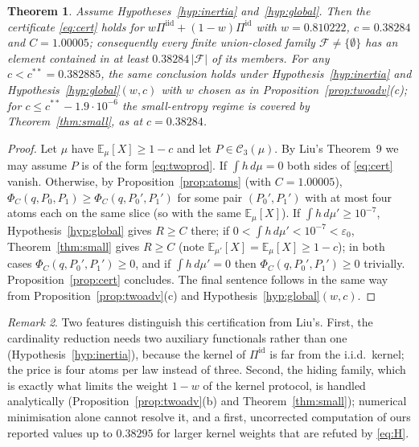 \documentclass[11pt,a4paper]{article}
\newtheorem{theorem}{Theorem}[section]
\theoremstyle{definition}
\theoremstyle{remark}
\newtheorem{remark}[theorem]{Remark}
\newcommand{\E}{\mathbb{E}}
\newcommand{\F}{\mathcal{F}}
\newcommand{\cC}{\mathcal{C}}
\newcommand{\ent}{h}
\newcommand{\iid}{\mathrm{iid}}
\newcommand{\id}{\mathrm{id}}
\begin{document}
\begin{theorem}\label{thm:main}
Assume Hypotheses~\ref{hyp:inertia} and~\ref{hyp:global}. Then the certificate \eqref{eq:cert} holds for $w\Pi^{\iid}+(1-w)\Pi^{\id}$ with $w=0.810222$, $c=0.38284$ and $C=1.00005$; consequently every finite union-closed family $\F\ne\{\emptyset\}$ has an element contained in at least $0.38284\,|\F|$ of its members. For any $c<c^{**}=0.382885$, the same conclusion holds under Hypothesis~\ref{hyp:inertia} and Hypothesis~\ref{hyp:global}$(w,c)$ with $w$ chosen as in Proposition~\ref{prop:twoadv}(c); for $c\le c^{**}-1.9\cdot10^{-6}$ the small-entropy regime is covered by Theorem~\ref{thm:small}, as at $c=0.38284$.
\end{theorem}
\begin{proof}
Let $\mu$ have $\E_\mu[X]\ge1-c$ and let $P\in\cC_3(\mu)$. By Liu's Theorem~9 we may assume $P$ is of the form \eqref{eq:twoprod}. If $\int\ent\,d\mu=0$ both sides of \eqref{eq:cert} vanish. Otherwise, by Proposition~\ref{prop:atoms} (with $C=1.00005$), $\Phi_C(q,P_0,P_1)\ge\Phi_C(q,P_0',P_1')$ for some pair $(P_0',P_1')$ with at most four atoms each on the same slice (so with the same $\E_\mu[X]$). If $\int\ent\,d\mu'\ge10^{-7}$, Hypothesis~\ref{hyp:global} gives $R\ge C$ there; if $0<\int\ent\,d\mu'<10^{-7}<\varepsilon_0$, Theorem~\ref{thm:small} gives $R\ge C$ (note $\E_{\mu'}[X]=\E_\mu[X]\ge1-c$); in both cases $\Phi_C(q,P_0',P_1')\ge0$, and if $\int\ent\,d\mu'=0$ then $\Phi_C(q,P_0',P_1')\ge0$ trivially. Proposition~\ref{prop:cert} concludes. The final sentence follows in the same way from Proposition~\ref{prop:twoadv}(c) and Hypothesis~\ref{hyp:global}$(w,c)$.
\end{proof}

\begin{remark}
Two features distinguish this certification from Liu's. First, the cardinality reduction needs two auxiliary functionals rather than one (Hypothesis~\ref{hyp:inertia}), because the kernel of $\Pi^{\id}$ is far from the i.i.d.\ kernel; the price is four atoms per law instead of three. Second, the hiding family, which is exactly what limits the weight $1-w$ of the kernel protocol, is handled analytically (Proposition~\ref{prop:twoadv}(b) and Theorem~\ref{thm:small}); numerical minimisation alone cannot resolve it, and a first, uncorrected computation of ours reported values up to $0.38295$ for larger kernel weights that are refuted by \eqref{eq:H}.
\end{remark}
\end{document}
